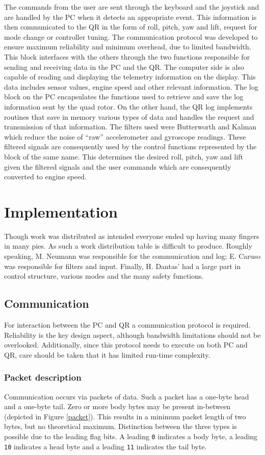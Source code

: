 \documentclass[11pt]{article}
\begin{document}
The commands from the user are sent through the keyboard and the joystick and are handled by the PC when it detects an appropriate event. This information is then communicated to the QR in the form of roll, pitch, yaw and lift, request for mode change or controller tuning.
The communication protocol was developed to ensure maximum reliability and minimum overhead, due to limited bandwidth. This block interfaces with the others through the two functions responsible for sending and receiving data in the PC and the QR.
The computer side is also capable of reading and displaying the telemetry information on the display. This data includes sensor values, engine speed and other relevant information.
The log block on the PC encapsulates the functions used to retrieve and save the log information sent by the quad rotor. On the other hand, the QR log implements routines that save in memory various types of data and handles the request and transmission of that information.
The filters used were Butterworth and Kalman which reduce the noise of ``raw'' accelerometer and gyroscope readings. These filtered signals are consequently used by the control functions represented by the block of the same name.
This determines the desired roll, pitch, yaw and lift given the filtered signals and the user commands which are consequently converted to engine speed.

\section{Implementation}
\label{sec:implementation}
Though work was distributed as intended everyone ended up having many fingers in many pies. As such a work distribution table is difficult to produce. Roughly speaking, M. Neumann was responsible for the communication and log; E. Caruso was responsible for filters and input. Finally, H. Dantas' had a large part in control structure, various modes and the many safety functions.

\subsection{Communication}
For interaction between the PC and QR a communication protocol is required. Reliability is the key design aspect, although bandwidth limitations should not be overlooked. Additionally, since this protocol needs to execute on both PC and QR, care should be taken that it has limited run-time complexity.

\subsubsection{Packet description}
Communication occurs via packets of data. Such a packet has a one-byte head and a one-byte tail. Zero or more body bytes may be present in-between (depicted in Figure \ref{packet}). This results in a minimum packet length of two bytes, but no theoretical maximum. Distinction between the three types is possible due to the leading flag bits. A leading \verb=0= indicates a body byte, a leading \verb=10= indicates a head byte and a leading \verb=11= indicates the tail byte.
\end{document}
